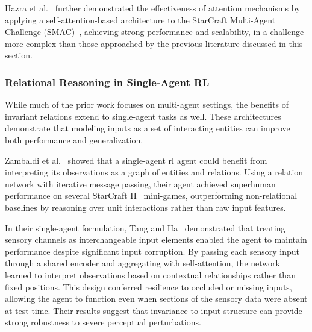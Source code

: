 Hazra et al.~\cite{hazra2024} further demonstrated the effectiveness 
of attention mechanisms by applying a self-attention-based architecture 
to the StarCraft Multi-Agent Challenge (SMAC)~\cite{samvelyan2019}, 
achieving strong performance and scalability,
in a challenge more complex than those approached by the previous 
literature discussed in this section.

\subsubsection{Relational Reasoning in Single-Agent RL}
While much of the prior work focuses on multi-agent settings, 
the benefits of invariant relations extend to single-agent tasks as well. 
These architectures demonstrate that modeling inputs as a set of 
interacting entities can improve both performance and generalization.

Zambaldi et al.~\cite{zambaldi2018} showed that a single-agent \gls{rl} agent could 
benefit from interpreting its observations as a graph of entities and relations. 
Using a relation network with iterative message passing, their agent achieved 
superhuman performance on several StarCraft II~\cite{vinyals2019} mini-games, 
outperforming non-relational baselines by reasoning over unit interactions 
rather than raw input features.

In their single-agent formulation, Tang and Ha~\cite{tang2021} demonstrated 
that treating sensory channels as interchangeable input elements enabled 
the agent to maintain performance despite significant input corruption. 
By passing each sensory input through a shared encoder and aggregating 
with self-attention, the network learned to interpret observations based 
on contextual relationships rather than fixed positions. 
This design conferred resilience to occluded or missing inputs, 
allowing the agent to function even when sections of the sensory 
data were absent at test time. Their results suggest that invariance 
to input structure can provide strong robustness to
severe perceptual perturbations.

\begin{comment}
    They propose a very similar question:
        "Sensory substitution refers to the brain’s ability to use one sensory modality 
        (e.g., touch) to supply environmental information normally gathered by 
        another sense (e.g., vision)."
    - Extremely similar to my interest in sensory degradation.
    - However, in their experiments they instead demonstrate an invariance in a singular
    observational domain. (They take a 2d image, chunk it and shuffle.)
\end{comment}

